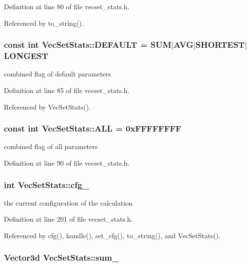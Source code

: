Definition at line 80 of file vecset\_\-stats.h.

Referenced by to\_\-string().\hypertarget{class_vec_set_stats_dd7f69167d67da63e03c36f57335c92c}{
\subsubsection[DEFAULT]{\setlength{\rightskip}{0pt plus 5cm}const int {\bf VecSetStats::DEFAULT} = {\bf SUM}$|${\bf AVG}$|${\bf SHORTEST}$|${\bf LONGEST}}}
\label{class_vec_set_stats_dd7f69167d67da63e03c36f57335c92c}


combined flag of default parameters 

Definition at line 85 of file vecset\_\-stats.h.

Referenced by VecSetStats().\hypertarget{class_vec_set_stats_b56c7865a2064a85a8e46d6add9bda9f}{
\subsubsection[ALL]{\setlength{\rightskip}{0pt plus 5cm}const int {\bf VecSetStats::ALL} = 0xFFFFFFFF}}
\label{class_vec_set_stats_b56c7865a2064a85a8e46d6add9bda9f}


combined flag of all parameters 

Definition at line 90 of file vecset\_\-stats.h.\hypertarget{class_vec_set_stats_c389362aaab290a37301168295c1bb07}{
\subsubsection[cfg\_\-]{\setlength{\rightskip}{0pt plus 5cm}int {\bf VecSetStats::cfg\_\-}}}
\label{class_vec_set_stats_c389362aaab290a37301168295c1bb07}


the current configuration of the calculation 

Definition at line 201 of file vecset\_\-stats.h.

Referenced by cfg(), handle(), set\_\-cfg(), to\_\-string(), and VecSetStats().\hypertarget{class_vec_set_stats_6b267c33c513e2ca267d1e75e54828dd}{
\subsubsection[sum\_\-]{\setlength{\rightskip}{0pt plus 5cm}Vector3d {\bf VecSetStats::sum\_\-}}}
\label{class_vec_set_stats_6b267c33c513e2ca267d1e75e54828dd}


